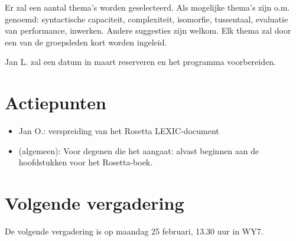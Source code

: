 Er zal een aantal thema's worden geselecteerd. Als mogelijke thema's zijn o.m. 
genoemd: 
syntactische capaciteit, complexiteit, isomorfie, tussentaal, evaluatie van
performance, inwerken.
Andere suggesties zijn welkom.
Elk thema zal  door een van de groepsleden kort worden ingeleid.

Jan L. zal een datum in maart reserveren en het programma voorbereiden.

\section{Actiepunten}
\begin{itemize}
  \item Jan O.: verspreiding van het Rosetta LEXIC-document
  \item (algemeen): Voor degenen die het aangaat: alvast
beginnen aan de hoofdstukken voor het Rosetta-boek.
\end{itemize}


\section{Volgende vergadering}
De volgende vergadering is op maandag 25 februari, 13.30 uur in WY7.\\


